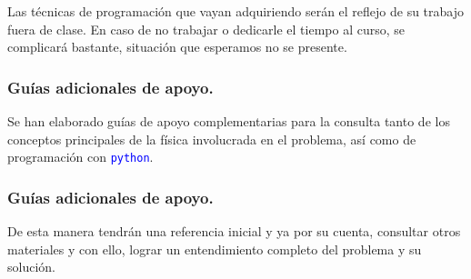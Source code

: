 \documentclass[12pt]{beamer}
\newcommand{\python}{\texttt{python}}
\newcommand{\textoazul}[1]{\textcolor{blue}{#1}}
\begin{document}
\begin{frame}
Las técnicas de programación que vayan adquiriendo serán el reflejo de su trabajo fuera de clase. En caso de no trabajar o dedicarle el tiempo al curso, se complicará bastante, situación que esperamos no se presente.
\end{frame}
\begin{frame}
\frametitle{Guías adicionales de apoyo.}
Se han elaborado guías de apoyo complementarias para la consulta tanto de los conceptos principales de la física involucrada en el problema, así como de programación con \textoazul{\python}.
\end{frame}
\begin{frame}
\frametitle{Guías adicionales de apoyo.}
De esta manera tendrán una referencia inicial y ya por su cuenta, consultar otros materiales y con ello, lograr un entendimiento completo del problema y su solución.
\end{frame}
\end{document}
